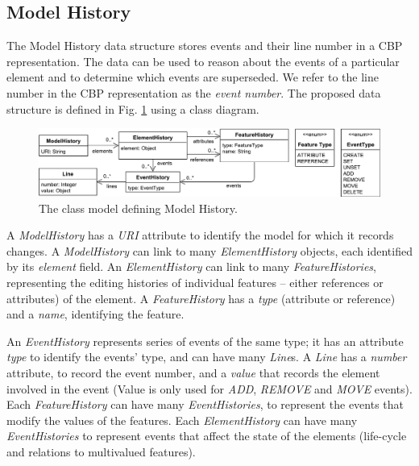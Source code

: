 \documentclass{llncs}
\begin{document}
    \subsection{Model History}
    \label{subsec:model_history}
    The Model History data structure stores events and their line number in a CBP representation.  The data can be used to reason about the events of a particular element and to determine which events are superseded.  We refer to the line number in the CBP representation as the \emph{event number}.
    The proposed data structure is defined in Fig. \ref{fig:object_history} using a class diagram.  
    
    \begin{figure}[ht]
        \centering
        \includegraphics[width=\linewidth]{object_history}
        \caption{The class model defining Model History.}
        \label{fig:object_history}
    \end{figure}
    
    A \emph{ModelHistory} has a \emph{URI} attribute to identify the model for which it records changes.  A \emph{ModelHistory}  can link to many \emph{ElementHistory} objects, each identified by its \emph{element} field. 
    An \emph{ElementHistory} can link to many \emph{FeatureHistories}, representing the editing histories of individual features -- either references or attributes) of the element. 
    A \emph{FeatureHistory} has a \emph{type} (attribute or reference) and a \emph{name}, identifying the feature.
    
    An \emph{EventHistory} represents series of events of the same type; it has an attribute \emph{type} to identify the events' type, and can have many \emph{Line}s.  A \emph{Line} has a \emph{number} attribute, to record the event number, and a \emph{value} that records the element involved in the event (Value is only used for \emph{ADD}, \emph{REMOVE} and \emph{MOVE} events). Each \emph{FeatureHistory} can have many \emph{EventHistories}, to represent the events that modify the values of the features.
    Each \emph{ElementHistory} can have many \emph{EventHistories} to represent events that affect the state of the elements (life-cycle and relations to multivalued features).
    
\end{document}
